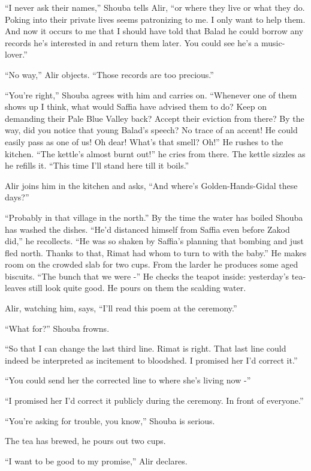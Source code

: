 \documentclass[twoside,11pt]{book}
\begin{document}
``I never ask their names,'' Shouba tells Alir, ``or where they live or what they do. Poking into their
private lives seems patronizing to me. I only want to help them.  And now it occurs to me that I should have told that
Balad he could borrow any records he's interested in and return them later. You could see he's a
music-lover.''

``No way,'' Alir objects. ``Those records are too precious.''

``You're right,'' Shouba agrees with him and carries on. ``Whenever one of them
shows up I think, what would Saffia have advised them to do? Keep on demanding their Pale Blue Valley back? Accept
their eviction from there? By the way, did you notice that young Balad's speech? No trace of an accent! He could easily
pass as one of us! Oh dear! What's that smell? Oh!'' He rushes to the kitchen. ``The kettle's
almost burnt out!'' he cries from there. The kettle sizzles as he refills it. ``This time
I'll stand here till it boils.''

Alir joins him in the kitchen and asks, ``And where's Golden-Hands-Gidal these days?''

``Probably in that village in the north.'' By the time the water has boiled Shouba has washed
the dishes. ``He'd distanced himself from Saffia even before Zakod did,'' he recollects.
``He was so shaken by Saffia's planning that bombing and just fled north. Thanks to that, Rimat had whom
to turn to with the baby.'' He makes room on the crowded slab for two cups. From the larder he produces
some aged biscuits. ``The bunch that we were -'' He checks the teapot inside: yesterday's
tea-leaves still look quite good.  He pours on them the scalding water.

Alir, watching him, says, ``I'll read this poem at the ceremony.''

``What for?'' Shouba frowns.

``So that I can change the last third line. Rimat is right. That last line could indeed be interpreted as
incitement to bloodshed. I promised her I'd correct it.''

``You could send her the corrected line to where she's living now -''

``I promised her I'd correct it publicly during the ceremony. In front of everyone.''

``You're asking for trouble, you know,'' Shouba is serious.

The tea has brewed, he pours out two cups.

``I want to be good to my promise,'' Alir declares.
\end{document}

